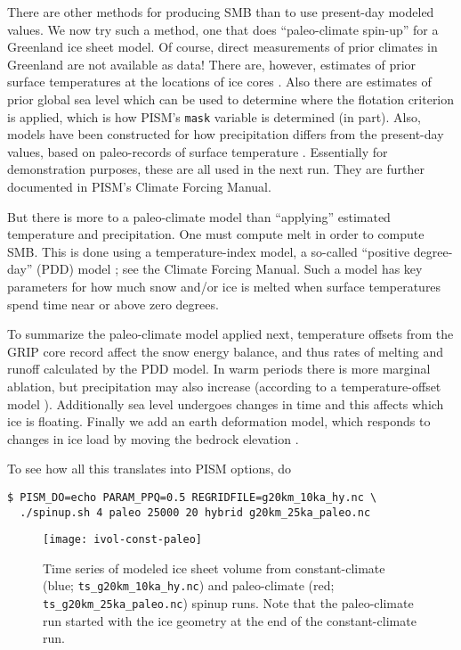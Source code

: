 There are other methods for producing SMB than to use present-day modeled values.  We now try such a method, one that does ``paleo-climate spin-up'' for a Greenland ice sheet model.  Of course, direct measurements of prior climates in Greenland are not available as data!  There are, however, estimates of prior surface temperatures at the locations of ice cores \cite[for GRIP]{JohnsenetalGRIP}.  Also there are estimates of prior global sea level \cite{Imbrieetal1984} which can be used to determine where the flotation criterion is applied, which is how PISM's \verb|mask| variable is determined (in part).  Also, models have been constructed for how precipitation differs from the present-day values, based on paleo-records of surface temperature \cite{Huybrechts02}.  Essentially for demonstration purposes, these are all used in the next run.  They are further documented in PISM's Climate Forcing Manual.

But there is more to a paleo-climate model than ``applying'' estimated temperature and precipitation.  One must compute melt in order to compute SMB.  This is done using a temperature-index model, a so-called ``positive degree-day'' (PDD) model \cite{Hock05}; see the Climate Forcing Manual.  Such a model has key parameters for how much snow and/or ice is melted when surface temperatures spend time near or above zero degrees.

To summarize the paleo-climate model applied next, temperature offsets from the GRIP core record affect the snow energy balance, and thus rates of melting and runoff calculated by the PDD model.  In warm periods there is more marginal ablation, but precipitation may also increase (according to a temperature-offset model \cite{Huybrechts02}).  Additionally sea level undergoes changes in time and this affects which ice is floating.  Finally we add an earth deformation model, which responds to changes in ice load by moving the bedrock elevation \cite{BLKfastearth}.

To see how all this translates into PISM options, do
\begin{verbatim}
$ PISM_DO=echo PARAM_PPQ=0.5 REGRIDFILE=g20km_10ka_hy.nc \
  ./spinup.sh 4 paleo 25000 20 hybrid g20km_25ka_paleo.nc
\end{verbatim}

\begin{figure}[ht]
\centering
\texttt{[image: ivol-const-paleo]}
\caption{Time series of modeled ice sheet volume from constant-climate (blue; \texttt{ts_g20km_10ka_hy.nc}) and paleo-climate (red; \texttt{ts_g20km_25ka_paleo.nc}) spinup runs.  Note that the paleo-climate run started with the ice geometry at the end of the constant-climate run.}
\label{fig:ivolconstpaleo}
\end{figure}

